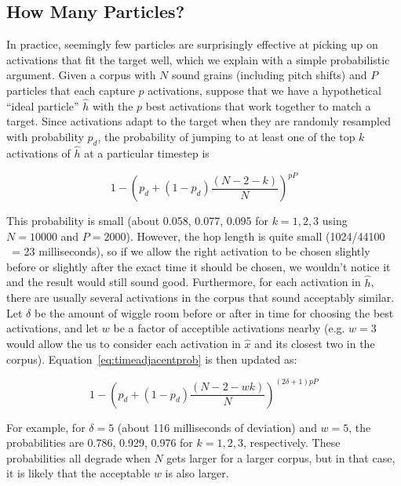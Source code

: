 \documentclass{article}
\begin{document}
\subsection{How Many Particles?}
\label{sec:activationprob}

In practice, seemingly few particles are surprisingly effective at picking up on activations that fit the target well, which we explain with a simple probabilistic argument.  Given a corpus with $N$ sound grains (including pitch shifts) and $P$ particles that each capture $p$ activations, suppose that we have a hypothetical ``ideal particle'' $\hat{h}$ with the $p$ best activations that work together to match a target.  Since activations adapt to the target when they are randomly resampled with probability $p_d$, the probability of jumping to at least one of the top $k$ activations of $\hat{h}$ at a particular timestep is 

\begin{equation}
    \label{eq:timeadjacentprob}
    1 - \left( p_d + (1-p_d) \frac{(N-2-k)}{N} \right)^{pP}
\end{equation}

This probability is small (about 0.058, 0.077, 0.095 for $k = 1, 2, 3$ using $N=10000$ and $P=2000$).  However, the hop length is quite small (1024/44100 ~= 23 milliseconds), so if we allow the right activation to be chosen slightly before or slightly after the exact time it should be chosen, we wouldn't notice it and the result would still sound good.  Furthermore, for each activation in $\hat{h}$, there are usually several activations in the corpus that sound acceptably similar.  Let $\delta$ be the amount of wiggle room before or after in time for choosing the best activations, and let $w$ be a factor of acceptible activations nearby (e.g. $w=3$ would allow the us to consider each activation in $\hat{x}$ and its closest two in the corpus).  Equation~\ref{eq:timeadjacentprob} is then updated as:

\begin{equation}
    \label{eq:timeadjacentprobmodified}
    1 - \left( p_d + (1-p_d) \frac{(N-2-wk)}{N} \right)^{(2 \delta +1)pP}
\end{equation}

For example, for $\delta=5$ (about 116 milliseconds of deviation) and $w = 5$, the probabilities are 0.786, 0.929, 0.976 for $k=1, 2, 3$, respectively.  These probabilities all degrade when $N$ gets larger for a larger corpus, but in that case, it is likely that the acceptable $w$ is also larger.
\end{document}
